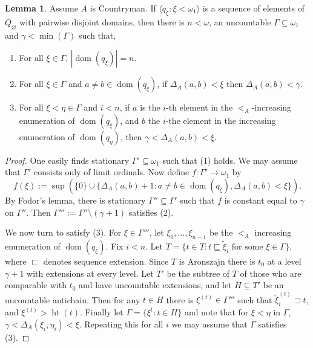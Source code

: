 \documentclass[10pt]{amsart}
\theoremstyle{definition}
\newtheorem{lemma}[theorem]{Lemma}
\theoremstyle{remark}
\newcommand{\es}{\varnothing}
\newcommand{\seb}{\subseteq}
\newcommand{\setm}{\setminus}
\newcommand{\tup}[1]{\langle#1\rangle}
\newcommand{\1}{\mathbbm{1}}
\DeclareMathOperator{\dom}{dom}
\DeclareMathOperator{\al}{ht}
\begin{document}
\begin{lemma}\label{lem:moore-technical}
  Assume $A$ is Countryman. If
  $\tup{q_{\xi} : \xi < \omega_{1}}$ is a sequence
  of elements of $Q_{\es}$ with pairwise disjoint domains, then
  there is $n < \omega$, an uncountable $\Gamma \seb \omega_{1}$ and $\gamma < \min(\Gamma)$
  such that,
  \begin{enumerate}\itemsep0em
    \item For all $\xi \in \Gamma$, $|\dom(q_{\xi})| = n$.
    \item For all $\xi \in \Gamma$ and $a \neq b \in \dom(q_{\xi})$,
    if $\Delta_{A}(a,b) < \xi$ then $\Delta_{A}(a,b) < \gamma$.
    \item For all $\xi < \eta \in \Gamma$ and $i < n$, if $a$ is
    the $i$-th element in the $<_{A}$-increasing enumeration of $\dom(q_{\xi})$,
    and $b$ the $i$-the element in the increasing enumeration of $\dom(q_{\eta})$,
    then $\gamma < \Delta_{A}(a,b) < \xi$.
  \end{enumerate}
\end{lemma}
\begin{proof}
  One easily finds stationary $\Gamma' \seb \omega_{1}$
  such that (1) holds. We may assume that $\Gamma'$ consists only
  of limit ordinals. Now define $f : \Gamma' \to \omega_{1}$
  by
  \[f(\xi) := \sup(\{0\} \cup \{\Delta_{A}(a,b) + 1 : a\neq b \in \dom(q_{\xi}), \Delta_{A}(a,b) < \xi\}).\]
  By Fodor's lemma, there is stationary $\Gamma '' \seb \Gamma'$
  such that $f$ is constant equal to $\gamma$ on $\Gamma''$. Then
  $\Gamma''' := \Gamma'' \setm (\gamma + 1)$ satisfies (2).

  We now turn to satisfy (3). For $\xi \in \Gamma'''$, let
  $\xi_{0},\dots,\xi_{n-1}$ be the $<_{A}$ increasing enumeration
  of $\dom(q_{\xi})$. Fix $i < n$. Let
  $T = \{t \in T : t \sqsubseteq \tilde{\xi}_{i}
  \text{ for some $\xi \in \Gamma$}\}$, where $\sqsubset$ denotes sequence extension.
  Since $T$ is Aronszajn there is
  $t_{0}$  at a level $\gamma + 1$ with
  extensions at every level. Let $T'$ be the subtree of $T$ of those
  who are comparable with $t_{0}$ and have uncountable extensions, and
  let $H \seb T'$ be an uncountable antichain.
  Then for any $t \in H$ there is $\xi^{(t)} \in \Gamma'''$ such that
  $\tilde{\xi}^{(t)}_{i} \sqsupset t$, and $\xi^{(t)} > \al(t)$.
  Finally let $\Gamma = \{\xi^{t} : t \in H\}$ and
  note that for $\xi < \eta$ in $\Gamma$,
  $\gamma < \Delta_{A}(\xi_{i},\eta_{i}) < \xi$. Repeating this for
  all $i$
  we may assume that $\Gamma$ satisfies (3).
\end{proof}
\end{document}
